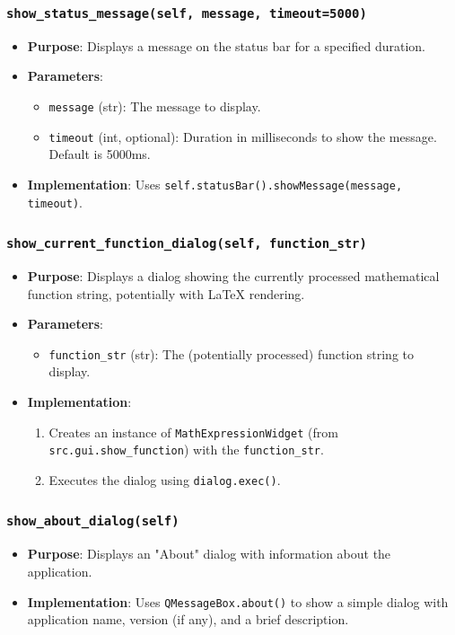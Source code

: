 \documentclass[12pt,a4paper]{report}
\begin{document}
\subsubsection{\texttt{show\_status\_message(self, message, timeout=5000)}}
\begin{itemize}
    \item \textbf{Purpose}: Displays a message on the status bar for a specified duration.
    \item \textbf{Parameters}:
        \begin{itemize}
            \item \texttt{message} (str): The message to display.
            \item \texttt{timeout} (int, optional): Duration in milliseconds to show the message. Default is 5000ms.
        \end{itemize}
    \item \textbf{Implementation}: Uses \texttt{self.statusBar().showMessage(message, timeout)}.
\end{itemize}

\subsubsection{\texttt{show\_current\_function\_dialog(self, function\_str)}}
\begin{itemize}
    \item \textbf{Purpose}: Displays a dialog showing the currently processed mathematical function string, potentially with LaTeX rendering.
    \item \textbf{Parameters}:
        \begin{itemize}
            \item \texttt{function\_str} (str): The (potentially processed) function string to display.
        \end{itemize}
    \item \textbf{Implementation}:
        \begin{enumerate}
            \item Creates an instance of \texttt{MathExpressionWidget} (from \texttt{src.gui.show\_function}) with the \texttt{function\_str}.
            \item Executes the dialog using \texttt{dialog.exec()}.
        \end{enumerate}
\end{itemize}

\subsubsection{\texttt{show\_about\_dialog(self)}}
\begin{itemize}
    \item \textbf{Purpose}: Displays an "About" dialog with information about the application.
    \item \textbf{Implementation}: Uses \texttt{QMessageBox.about()} to show a simple dialog with application name, version (if any), and a brief description.
\end{itemize}
\end{document}
